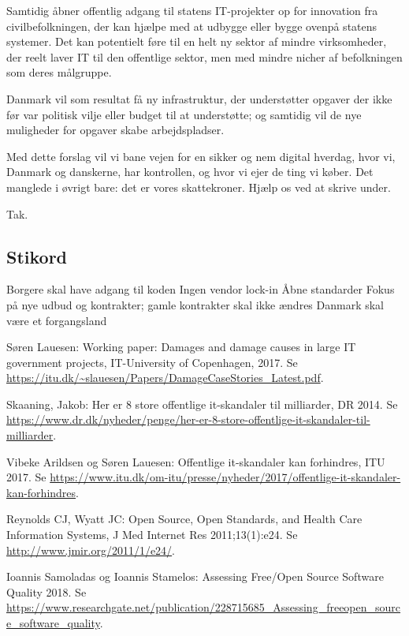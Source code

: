 \documentclass[fleqn]{article}
\begin{document}
Samtidig åbner offentlig adgang til statens IT-projekter op for innovation fra civilbefolkningen, der kan hjælpe med at udbygge eller bygge ovenpå statens systemer.
Det kan potentielt føre til en helt ny sektor af mindre virksomheder, der reelt laver IT til den offentlige sektor, men med mindre nicher af befolkningen som deres målgruppe.

Danmark vil som resultat få ny infrastruktur, der understøtter opgaver der ikke før var politisk vilje eller budget til at understøtte; og samtidig vil de nye muligheder for opgaver skabe arbejdspladser.

\vskip10pt
Med dette forslag vil vi bane vejen for en sikker og nem digital
hverdag, hvor vi, Danmark og danskerne, har kontrollen, og hvor vi ejer de ting vi køber.
Det manglede i øvrigt bare: det er vores skattekroner.
\vskip5pt
Hjælp os ved at skrive under.

\vskip5pt
Tak.

\subsection{Stikord}
Borgere skal have adgang til koden
Ingen vendor lock-in
Åbne standarder
Fokus på nye udbud og kontrakter; gamle kontrakter skal ikke ændres
Danmark skal være et forgangsland

\begin{thebibliography}{1}

 Søren Lauesen: Working paper: Damages and damage causes in
large IT government projects, IT-University of Copenhagen, 2017. Se
\url{https://itu.dk/~slauesen/Papers/DamageCaseStories_Latest.pdf}.

 Skaaning, Jakob: Her er 8 store offentlige it-skandaler til milliarder, DR
2014. Se
\url{https://www.dr.dk/nyheder/penge/her-er-8-store-offentlige-it-skandaler-til-milliarder}.

 Vibeke Arildsen og Søren Lauesen: Offentlige it-skandaler kan forhindres, ITU 2017.
Se \url{https://www.itu.dk/om-itu/presse/nyheder/2017/offentlige-it-skandaler-kan-forhindres}.

 Reynolds CJ, Wyatt JC: Open Source, Open Standards, and Health Care Information
Systems, J Med Internet Res 2011;13(1):e24. Se \url{http://www.jmir.org/2011/1/e24/}.

 Ioannis Samoladas og Ioannis Stamelos: Assessing Free/Open Source Software
Quality 2018. Se
\url{https://www.researchgate.net/publication/228715685_Assessing_freeopen_source_software_quality}.

\end{thebibliography}
\end{document}
